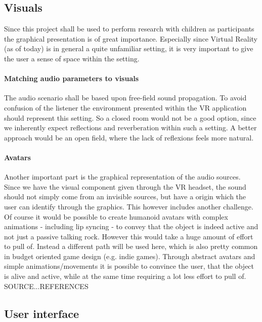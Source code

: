 \documentclass[a4paper,11pt]{article}%
\renewcommand{\\}{\vspace*{0.5\baselineskip} \newline}
\begin{document}
\subsection{Visuals}
\label{sec:visuals}
Since this project shall be used to perform research with children as participants the graphical presentation is of great importance. Especially since Virtual Reality (as of today) is in general a quite unfamiliar setting, it is very important to give the user a sense of space within the setting.

\paragraph{Matching audio parameters to visuals} The audio scenario shall be based upon free-field sound propagation. To avoid confusion of the listener the environment presented within the VR application should represent this setting. So a closed room would not be a good option, since we inherently expect reflections and reverberation within such a setting. A better approach would be an open field, where the lack of reflexions feels more natural.

\paragraph{Avatars} Another important part is the graphical representation of the audio sources. Since we have the visual component given through the VR headset, the sound should not simply come from an invisible sources, but have a origin which the user can identify through the graphics. This however includes another challenge. Of course it would be possible to create humanoid avatars with complex animations - including lip syncing - to convey that the object is indeed active and not just a passive talking rock. However this would take a huge amount of effort to pull of. Instead a different path will be used here, which is also pretty common in budget oriented game design (e.g. indie games). Through abstract avatars and simple animations/movements it is possible to convince the user, that the object is alive and active, while at the same time requiring a lot less effort to pull of.
SOURCE...REFERENCES


\subsection{User interface}
\label{sec:approach_ui}
\end{document}
